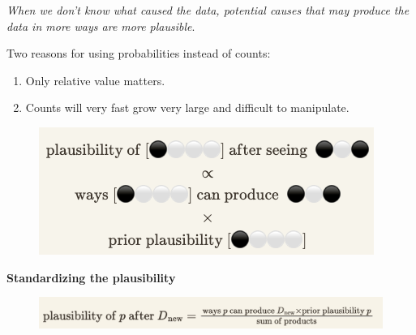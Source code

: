 \documentclass[
  letterpaper,
  DIV=11,
  numbers=noendperiod]{scrreprt}
\providecommand{\tightlist}{%
  \setlength{\itemsep}{0pt}\setlength{\parskip}{0pt}}\usepackage{longtable,booktabs,array}
\begin{document}
\begin{tcolorbox}[enhanced jigsaw, colframe=quarto-callout-tip-color-frame, colback=white, toprule=.15mm, breakable, arc=.35mm, bottomtitle=1mm, colbacktitle=quarto-callout-tip-color!10!white, toptitle=1mm, titlerule=0mm, title=\textcolor{quarto-callout-tip-color}{\faLightbulb}\hspace{0.5em}{Principle of honest ignorance}, leftrule=.75mm, opacityback=0, rightrule=.15mm, opacitybacktitle=0.6, bottomrule=.15mm, left=2mm, coltitle=black]

\emph{When we don't know what caused the data, potential causes that may
produce the data in more ways are more plausible}.

\end{tcolorbox}

Two reasons for using probabilities instead of counts:

\begin{enumerate}
\def\labelenumi{\arabic{enumi}.}
\tightlist
\item
  Only relative value matters.
\item
  Counts will very fast grow very large and difficult to manipulate.
\end{enumerate}

\begin{figure}

{\centering \includegraphics{img/plausibility-formula-1-min.png}

}

\end{figure}

\textbf{Standardizing the plausibility}

\begin{figure}

{\centering \includegraphics{img/plausibility-formula-2-min.png}

}

\end{figure}
\end{document}

